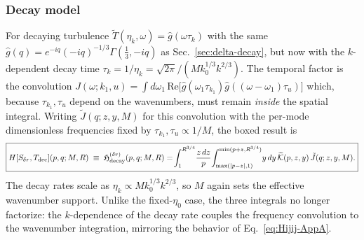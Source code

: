 \documentclass[10pt,prd,aps,nobibnotes,superscriptaddress,preprintnumbers,notitlepage]{revtex4-1}
\begin{document}
\subsubsection{Decay model}

For decaying turbulence $\widetilde T(\eta_k,\omega)=\hat g(\omega\tau_k)$ with the same $\hat g(q)=e^{-iq}(-iq)^{-1/3}\Gamma(\tfrac13,-iq)$ as Sec.~\ref{sec:delta-decay}, but now with the $k$-dependent decay time $\tau_k=1/\eta_k=\sqrt{2\pi}/(M k_0^{1/3}k^{2/3})$. The temporal factor is the convolution $J(\omega;k_1,u)=\int d\omega_1\,\mathrm{Re}\bigl[\hat g(\omega_1\tau_{k_1})\hat g((\omega-\omega_1)\tau_u)\bigr]$ which, because $\tau_{k_1},\tau_u$ depend on the wavenumbers, must remain \emph{inside} the spatial integral. Writing $\tilde J(q;z,y,M)$ for this convolution with the per-mode dimensionless frequencies fixed by $\tau_{k_1},\tau_u\propto 1/M$, the boxed result is
\begin{equation}
  \boxed{
  H[S_{\delta r},T_{\rm dec}](p,q;M,R)\;\equiv\;\mathfrak{H}^{(\delta r)}_{\rm decay}(p,q;M,R) = \!\int_{1}^{R^{3/4}}\!\frac{z\,dz}{p}\!\int_{\max(|p-z|,1)}^{\min(p+z,R^{3/4})}\!y\,dy\,\widetilde{\mathcal K}(p,z,y)\,\tilde J(q;z,y,M).
  }
  \label{eq:dimless-white-decay}
\end{equation}
The decay rates scale as $\eta_k\propto M k_0^{1/3}k^{2/3}$, so $M$ again sets the effective wavenumber support. Unlike the fixed-$\eta_0$ case, the three integrals no longer factorize: the $k$-dependence of the decay rate couples the frequency convolution to the wavenumber integration, mirroring the behavior of Eq.~\eqref{eq:Hijij-AppA}.
\end{document}
